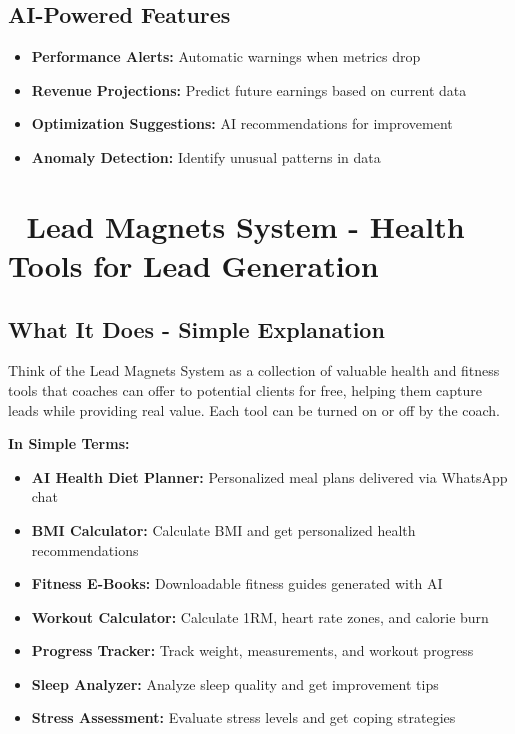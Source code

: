 \documentclass[12pt,a4paper]{article}
\begin{document}
\subsection{AI-Powered Features}
\begin{itemize}
    \item \textbf{Performance Alerts:} Automatic warnings when metrics drop
    \item \textbf{Revenue Projections:} Predict future earnings based on current data
    \item \textbf{Optimization Suggestions:} AI recommendations for improvement
    \item \textbf{Anomaly Detection:} Identify unusual patterns in data
\end{itemize}

\section{🎯 Lead Magnets System - Health Tools for Lead Generation}

\subsection{What It Does - Simple Explanation}
Think of the Lead Magnets System as a collection of valuable health and fitness tools that coaches can offer to potential clients for free, helping them capture leads while providing real value. Each tool can be turned on or off by the coach.

\textbf{In Simple Terms:}
\begin{itemize}
    \item \textbf{AI Health Diet Planner:} Personalized meal plans delivered via WhatsApp chat
    \item \textbf{BMI Calculator:} Calculate BMI and get personalized health recommendations
    \item \textbf{Fitness E-Books:} Downloadable fitness guides generated with AI
    \item \textbf{Workout Calculator:} Calculate 1RM, heart rate zones, and calorie burn
    \item \textbf{Progress Tracker:} Track weight, measurements, and workout progress
    \item \textbf{Sleep Analyzer:} Analyze sleep quality and get improvement tips
    \item \textbf{Stress Assessment:} Evaluate stress levels and get coping strategies
\end{itemize}
\end{document}
